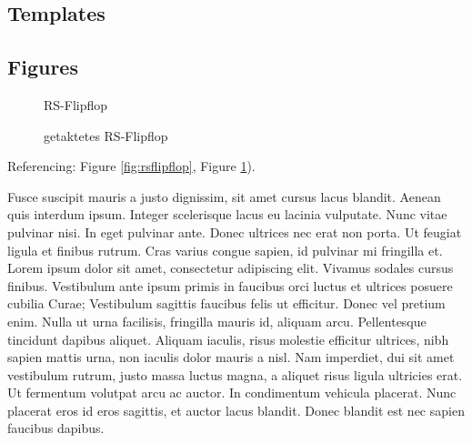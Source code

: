 \clearpage

\begin{appendices}

\section{Templates}
\subsection{Figures}
\begin{figure}[h!]
	\centering
	\centering
	\caption{RS-Flipflop}%
	\label{fig:rsflipflop}
	\endminipage\hspace{1cm}   
	\centering
	\caption{getaktetes RS-Flipflop}%
	\label{fig:rsflipfloptakt}
	\endminipage
\end{figure}

Referencing: Figure \ref{fig:rsflipflop}, Figure \ref{fig:rsflipfloptakt}).



Fusce suscipit mauris a justo dignissim, sit amet cursus lacus blandit. Aenean quis interdum ipsum. Integer scelerisque lacus eu lacinia vulputate. Nunc vitae pulvinar nisi. In eget pulvinar ante. Donec ultrices nec erat non porta. Ut feugiat ligula et finibus rutrum. Cras varius congue sapien, id pulvinar mi fringilla et.
%
%
Lorem ipsum dolor sit amet, consectetur adipiscing elit. Vivamus sodales cursus finibus. Vestibulum ante ipsum primis in faucibus orci luctus et ultrices posuere cubilia Curae; Vestibulum sagittis faucibus felis ut efficitur. Donec vel pretium enim. Nulla ut urna facilisis, fringilla mauris id, aliquam arcu. Pellentesque tincidunt dapibus aliquet. Aliquam iaculis, risus molestie efficitur ultrices, nibh sapien mattis urna, non iaculis dolor mauris a nisl. Nam imperdiet, dui sit amet vestibulum rutrum, justo massa luctus magna, a aliquet risus ligula ultricies erat. Ut fermentum volutpat arcu ac auctor. In condimentum vehicula placerat. Nunc placerat eros id eros sagittis, et auctor lacus blandit. Donec blandit est nec sapien faucibus dapibus.


\end{appendices}
